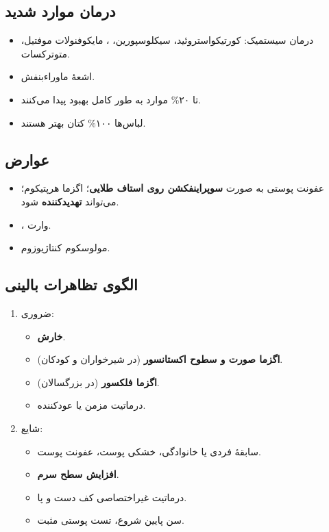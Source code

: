 \documentclass[12pt,a4paper]{article}
\begin{document}
\subsection*{درمان موارد شدید}
\begin{itemize}
\item درمان سیستمیک: کورتیکواستروئید، سیکلوسپورین، ، مایکوفنولات موفتیل، متوترکسات.
\item اشعهٔ ماوراءبنفش.
\end{itemize}

\begin{itemize}
\item تا ۲۰\% موارد  به طور کامل بهبود پیدا می‌کنند.
\item لباس‌ها ۱۰۰\% کتان بهتر هستند.
\end{itemize}

\clearpage
{}
\subsection*{عوارض }
\begin{itemize}
\item عفونت  پوستی به صورت \textbf{سوپراینفکشن روی استاف طلایی}؛ اگزما هرپتیکوم؛ می‌تواند \textbf{تهدیدکننده} شود.
\item {}، وارت.
\item مولوسکوم کنتاژیوزوم.
\end{itemize}

\subsection*{الگوی تظاهرات بالینی }
\begin{enumerate}
\item ضروری:
\begin{itemize}
\item \textbf{خارش}.
\item \textbf{اگزما صورت و سطوح اکستانسور} (در شیرخواران و کودکان).
\item \textbf{اگزما فلکسور} (در بزرگسالان).
\item درماتیت مزمن یا عودکننده.
\end{itemize}
\item شایع:
\begin{itemize}
\item سابقهٔ فردی یا خانوادگی، خشکی پوست، عفونت پوست.
\item \textbf{افزایش سطح  سرم}.
\item درماتیت غیراختصاصی کف دست و پا.
\item سن پایین شروع، تست پوستی مثبت.
\end{itemize}
\end{enumerate}
\end{document}
